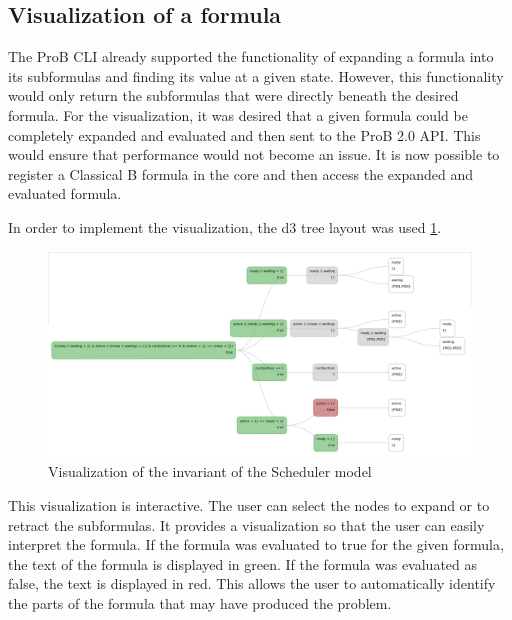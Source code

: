 \subsection{Visualization of a formula}

The ProB CLI already supported the functionality of expanding a formula into its subformulas and finding its value at a given state. However, this functionality would only return the subformulas that were directly beneath the desired formula. For the visualization, it was desired that a given formula could be completely expanded and evaluated and then sent to the ProB 2.0 API. This would ensure that performance would not become an issue. It is now possible to register a Classical B formula in the core and then access the expanded and evaluated formula.

In order to implement the visualization, the d3 tree layout was used \ref{predicate}.

\begin{figure}[ht!]
\centering
\includegraphics[width=15cm]{bilder/invariant.png}
\caption{Visualization of the invariant of the Scheduler model}
\label{predicate}
\end{figure}

This visualization is interactive. The user can select the nodes to expand or to retract the subformulas. It provides a visualization so that the user can easily interpret the formula. If the formula was evaluated to true for the given formula, the text of the formula is displayed in green. If the formula was evaluated as false, the text is displayed in red. This allows the user to automatically identify the parts of the formula that may have produced the problem. 